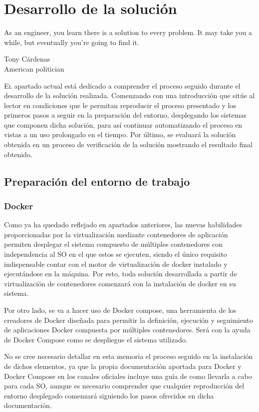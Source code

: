 \chapter{Desarrollo de la solución}\label{chp-04}
\epigraph{As an engineer, you learn there is a solution to every problem. It may take you a while, but eventually you're going to find it.}{Tony Cárdenas\\American politician}

\lettrine[lraise=-0.1, lines=2, loversize=0.2]{E}{l} apartado actual está dedicado a comprender el proceso seguido durante el desarrollo de la solución realizada. Comenzando con una introducción que sitúe al lector en condiciones que le permitan reproducir el proceso presentado y los primeros pasos a seguir en la preparación del entorno, desplegando los sistemas que componen dicha solución, para así continuar automatizando el proceso en vistas a un uso prolongado en el tiempo. Por último, se evaluará la solución obtenida en un proceso de verificación de la solución mostrando el resultado final obtenido.

\section{Preparación del entorno de trabajo}\label{preparacion}

\subsection{Docker}
Como ya ha quedado reflejado en apartados anteriores, las nuevas habilidades proporcionadas por la virtualización mediante contenedores de aplicación permiten desplegar el sistema compuesto de múltiples contenedores con independencia al \gls{SO} en el que estos se ejecuten, siendo el único requisito indispensable contar con el motor de virtualización de docker instalado y ejecutándose en la máquina. Por esto, toda solución desarrollada a partir de virtualización de contenedores comenzará con la instalación de docker en su sistema.

Por otro lado, se va a hacer uso de Docker compose, una herramienta de los creadores de Docker diseñada para permitir la definición, ejecución y seguimiento de aplicaciones Docker compuesta por múltiples contenedores. Será con la ayuda de Docker Compose como se despliegue el sistema utilizado.

No se cree necesario detallar en esta memoria el proceso seguido en la instalación de dichos elementos, ya que la propia documentación aportada para Docker\cite{dockerinstallation2017} y Docker Compose\cite{dockercomposeinstallation2017} en los canales oficiales incluye una guía de como llevarla a cabo para cada \gls{SO}, aunque es necesario comprender que cualquier reproducción del entorno desplegado comenzará siguiendo los pasos ofrecidos en dicha documentación.

